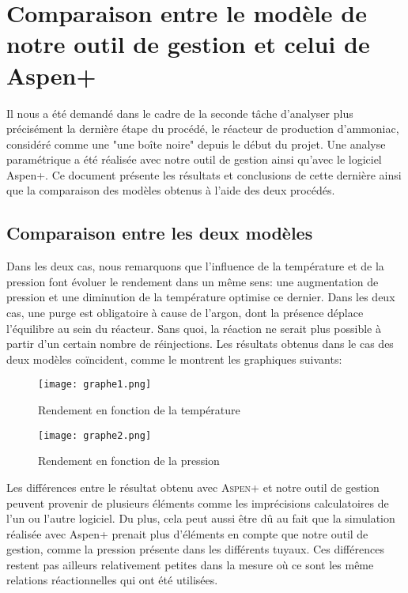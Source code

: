 
\section*{Comparaison entre le modèle de notre outil de gestion et celui de Aspen+}
Il nous a été demandé dans le cadre de la seconde tâche d'analyser plus précisément la dernière étape du procédé, le réacteur de production d'ammoniac, considéré comme une "une boîte noire" depuis le début du projet. Une analyse paramétrique a été réalisée avec notre outil de gestion ainsi qu'avec le logiciel Aspen+. Ce document présente les résultats et conclusions de cette dernière ainsi que la comparaison des modèles obtenus à l'aide des deux procédés.


\subsection*{Comparaison entre les deux modèles}
Dans les deux cas, nous remarquons que l'influence de la température et de la pression font évoluer le rendement dans un même sens: une augmentation de pression et une diminution de la température optimise ce dernier.
Dans les deux cas, une purge est obligatoire à cause  de l'argon, dont la présence déplace l'équilibre au sein du réacteur. Sans quoi, la réaction ne serait plus possible à partir d'un certain nombre de réinjections. Les résultats obtenus dans le cas des deux modèles coïncident, comme le montrent les graphiques suivants:

\begin{figure}[ht!]
 \centering
 \texttt{[image: graphe1.png]}
 \caption{Rendement en fonction de la température}
 \label{scheme}
\end{figure}

\begin{figure}[ht!]
 \centering
 \texttt{[image: graphe2.png]}
 \caption{Rendement en fonction de la pression}
 \label{scheme}
\end{figure}

Les différences entre le résultat obtenu avec \textsc{Aspen+} et notre outil de gestion peuvent provenir de plusieurs éléments comme les imprécisions calculatoires de l'un ou l'autre logiciel. Du plus, cela peut aussi être dû au fait que la simulation réalisée avec Aspen+ prenait plus d'éléments en compte que notre outil de gestion, comme la pression présente dans les différents tuyaux. Ces différences restent pas ailleurs relativement petites dans la mesure où ce sont les même relations réactionnelles qui ont été utilisées.



